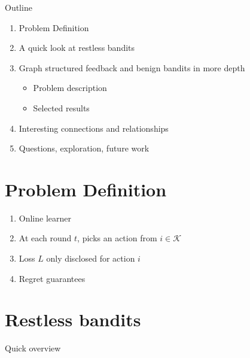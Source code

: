 \documentclass{beamer}
\begin{document}
\begin{frame}{Outline}
  \begin{enumerate}

  \item Problem Definition
  
  \item
    A quick look at restless bandits
    
  \item
    Graph structured feedback and benign bandits in more depth
    \begin{itemize}
    \item
      Problem description
    \item
      Selected results
    \end{itemize}
    
  \item
    Interesting connections and relationships 
  \item
    Questions, exploration, future work
    
  \end{enumerate}
\end{frame}

\section{Problem Definition}
\begin{frame}
  \begin{enumerate}
    \item Online learner
    \item At each round $t$, picks an action from $i\in\mathcal{K}$
    \item Loss $L$ only disclosed for action $i$
    \item Regret guarantees
  \end{enumerate}
\end{frame}


\section{Restless bandits}

\begin{frame}{Quick overview}
\end{frame}
\end{document}
